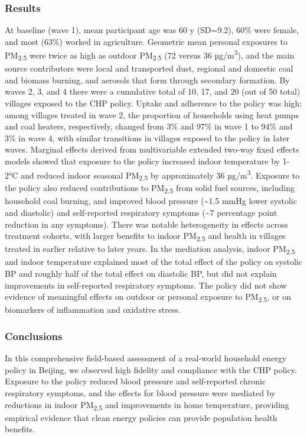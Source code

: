 \documentclass[
  letterpaper,
  DIV=11,
  numbers=noendperiod]{scrartcl}
\begin{document}
\subsubsection*{Results}\label{results}

At baseline (wave 1), mean participant age was 60 y (SD=9.2), 60\% were
female, and most (63\%) worked in agriculture. Geometric mean personal
exposures to PM\textsubscript{2.5} were twice as high as outdoor
PM\textsubscript{2.5} (72 versus 36 µg/m\textsuperscript{3}), and the
main source contributors were local and transported dust, regional and
domestic coal and biomass burning, and aerosols that form through
secondary formation. By waves 2, 3, and 4 there were a cumulative total
of 10, 17, and 20 (out of 50 total) villages exposed to the CHP policy.
Uptake and adherence to the policy was high: among villages treated in
wave 2, the proportion of households using heat pumps and coal heaters,
respectively, changed from 3\% and 97\% in wave 1 to 94\% and 3\% in
wave 4, with similar transitions in villages exposed to the policy in
later waves. Marginal effects derived from multivariable extended
two-way fixed effects models showed that exposure to the policy
increased indoor temperature by 1-2°C and reduced indoor seasonal
PM\textsubscript{2.5} by approximately 36 µg/m\textsuperscript{3}.
Exposure to the policy also reduced contributions to
PM\textsubscript{2.5} from solid fuel sources, including household coal
burning, and improved blood pressure (\textasciitilde1.5 mmHg lower
systolic and diastolic) and self-reported respiratory symptoms
(\textasciitilde7 percentage point reduction in any symptoms). There was
notable heterogeneity in effects across treatment cohorts, with larger
benefits to indoor PM\textsubscript{2.5} and health in villages treated
in earlier relative to later years. In the mediation analysis, indoor
PM\textsubscript{2.5} and indoor temperature explained most of the total
effect of the policy on systolic BP and roughly half of the total effect
on diastolic BP, but did not explain improvements in self-reported
respiratory symptoms. The policy did not show evidence of meaningful
effects on outdoor or personal exposure to PM\textsubscript{2.5}, or on
biomarkers of inflammation and oxidative stress.

\subsubsection*{Conclusions}\label{conclusions}

In this comprehensive field-based assessment of a real-world household
energy policy in Beijing, we observed high fidelity and compliance with
the CHP policy. Exposure to the policy reduced blood pressure and
self-reported chronic respiratory symptoms, and the effects for blood
pressure were mediated by reductions in indoor PM\textsubscript{2.5} and
improvements in home temperature, providing empirical evidence that
clean energy policies can provide population health benefits.
\end{document}
